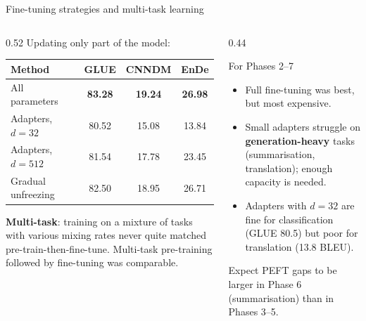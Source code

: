 \documentclass[aspectratio=169,11pt]{beamer}
\begin{document}
\begin{frame}{Fine-tuning strategies and multi-task learning}
  \begin{columns}[T]
    \begin{column}{0.52\textwidth}
      \footnotesize
      Updating only part of the model:
      \vspace{1mm}

      \begin{tabular}{@{}lccc@{}}
        \toprule
        Method & GLUE & CNNDM & EnDe\\
        \midrule
        All parameters & \textbf{83.28} & \textbf{19.24} & \textbf{26.98}\\
        Adapters, $d=32$ & 80.52 & 15.08 & 13.84\\
        Adapters, $d=512$ & 81.54 & 17.78 & 23.45\\
        Gradual unfreezing & 82.50 & 18.95 & 26.71\\
        \bottomrule
      \end{tabular}
      \vspace{2mm}

      \small
      \textbf{Multi-task}: training on a mixture of tasks with various mixing rates never quite matched pre-train-then-fine-tune. Multi-task pre-training followed by fine-tuning was comparable.
    \end{column}
    \begin{column}{0.44\textwidth}
      \begin{exampleblock}{For Phases 2--7}
        \small
        \begin{itemize}
          \item Full fine-tuning was best, but most expensive.
          \item Small adapters struggle on \textbf{generation-heavy} tasks (summarisation, translation); enough capacity is needed.
          \item Adapters with $d=32$ are fine for classification (GLUE 80.5) but poor for translation (13.8 BLEU).
        \end{itemize}
        Expect PEFT gaps to be larger in Phase 6 (summarisation) than in Phases 3--5.
      \end{exampleblock}
    \end{column}
  \end{columns}
\end{frame}
\end{document}
